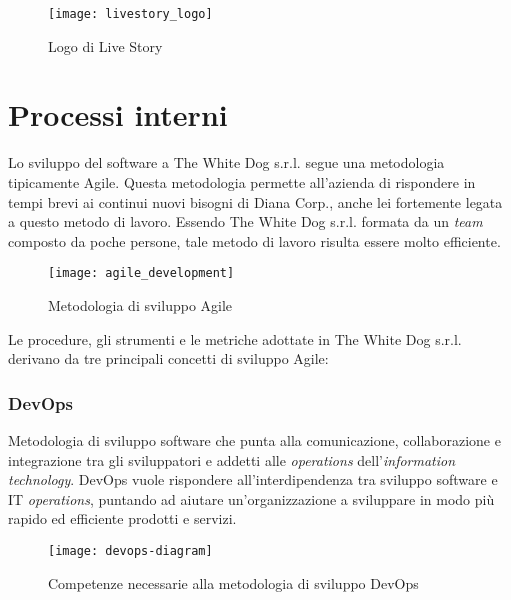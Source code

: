 \label{Live Story}
\begin{figure}[ht]
	\begin{center}
		\texttt{[image: livestory\_logo]}
		\caption{Logo di Live Story}
	\end{center}
\end{figure}
\FloatBarrier

\section{Processi interni}

Lo sviluppo del software a The White Dog s.r.l. segue una metodologia tipicamente Agile. Questa metodologia permette all'azienda di rispondere in tempi brevi ai continui nuovi bisogni di Diana Corp., anche lei fortemente legata a questo metodo di lavoro. Essendo The White Dog s.r.l. formata da un \textit{team} composto da poche persone, tale metodo di lavoro risulta essere molto efficiente.

\label{Metodologia Agile}
\begin{figure}[ht]
	\begin{center}
		\texttt{[image: agile\_development]}
		\caption{Metodologia di sviluppo Agile}
	\end{center}
\end{figure}
\FloatBarrier

Le procedure, gli strumenti e le metriche adottate in The White Dog s.r.l. derivano da tre principali concetti di sviluppo Agile:

\subsubsection{DevOps}

Metodologia di sviluppo software che punta alla comunicazione, collaborazione e integrazione tra gli sviluppatori e addetti alle \textit{operations} dell'\textit{information technology}. DevOps vuole rispondere all'interdipendenza tra sviluppo software e IT \textit{operations}, puntando ad aiutare un'organizzazione a sviluppare in modo più rapido ed efficiente prodotti e servizi.

\label{DevOps}
\begin{figure}[ht]
	\begin{center}
		\texttt{[image: devops-diagram]}
		\caption{Competenze necessarie alla metodologia di sviluppo DevOps}
	\end{center}
\end{figure}
\FloatBarrier

